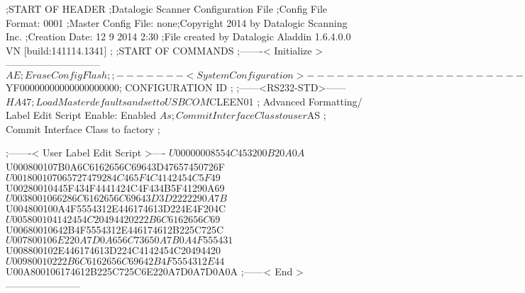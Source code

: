 ;START OF HEADER
;Datalogic Scanner Configuration File
;Config File Format: 0001
;Master Config File: none;Copyright 2014 by Datalogic Scanning Inc.
;Creation Date: 12 9 2014 2:30
;File created by Datalogic Aladdin 1.6.4.0.0 VN [build:141114.1341]
;
;START OF COMMANDS
;-------< Initialize >-----------------------------
$AE                 ; Erase Config Flash
;
;-------< System Configuration >-------------------------------
$YF00000000000000000000; CONFIGURATION ID
;
;------<RS232-STD>------
$HA47               ; Load Master defaults and set to USBCOM
$CLEEN01            ; Advanced Formatting/ Label Edit Script Enable: Enabled
$As                 ; Commit Interface Class to user
$AS                 ; Commit Interface Class to factory
;

;-------< User Label Edit Script >----
$U00000008554C453200B20A0A
$U000800107B0A6C6162656C69643D47657450726F
$U001800107065727479284C465F4C4142454C5F49
$U00280010445F434F4441424C4F434B5F41290A69
$U0038001066286C6162656C69643D3D2222290A7B
$U004800100A4F5554312E446174613D224E4F204C
$U005800104142454C20494420222B6C6162656C69
$U00680010642B4F5554312E446174612B225C725C
$U007800106E220A7D0A656C73650A7B0A4F555431
$U008800102E446174613D224C4142454C20494420
$U00980010222B6C6162656C69642B4F5554312E44
$U00A800106174612B225C725C6E220A7D0A7D0A0A
;------< End >-----------------------
